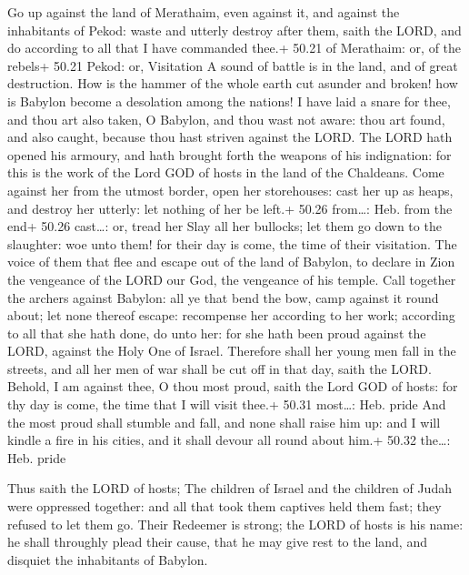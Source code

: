  Go up against the land of Merathaim, even against it,
and against the inhabitants of Pekod: waste and utterly destroy after
them, saith the LORD, and do according to all that I have commanded
thee.+ 50.21 of Merathaim: or, of the rebels+ 50.21 Pekod: or,
Visitation  A sound of battle is in the land, and of great
destruction.  How is the hammer of the whole earth cut
asunder and broken! how is Babylon become a desolation among the
nations!  I have laid a snare for thee, and thou art also
taken, O Babylon, and thou wast not aware: thou art found, and also
caught, because thou hast striven against the LORD.  The
LORD hath opened his armoury, and hath brought forth the weapons of his
indignation: for this is the work of the Lord GOD of hosts in the land
of the Chaldeans.  Come against her from the utmost border,
open her storehouses: cast her up as heaps, and destroy her utterly: let
nothing of her be left.+ 50.26 from\ldots: Heb. from the end+ 50.26
cast\ldots: or, tread her  Slay all her bullocks; let them
go down to the slaughter: woe unto them! for their day is come, the time
of their visitation.  The voice of them that flee and
escape out of the land of Babylon, to declare in Zion the vengeance of
the LORD our God, the vengeance of his temple.  Call
together the archers against Babylon: all ye that bend the bow, camp
against it round about; let none thereof escape: recompense her
according to her work; according to all that she hath done, do unto her:
for she hath been proud against the LORD, against the Holy One of
Israel.  Therefore shall her young men fall in the streets,
and all her men of war shall be cut off in that day, saith the LORD.
 Behold, I am against thee, O thou most proud, saith the
Lord GOD of hosts: for thy day is come, the time that I will visit
thee.+ 50.31 most\ldots: Heb. pride  And the most proud
shall stumble and fall, and none shall raise him up: and I will kindle a
fire in his cities, and it shall devour all round about him.+ 50.32
the\ldots: Heb. pride

 Thus saith the LORD of hosts; The children of Israel and
the children of Judah were oppressed together: and all that took them
captives held them fast; they refused to let them go. 
Their Redeemer is strong; the LORD of hosts is his name: he shall
throughly plead their cause, that he may give rest to the land, and
disquiet the inhabitants of Babylon.

